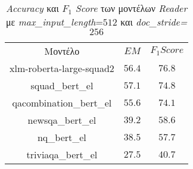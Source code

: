 \begin{table}[H]
    \captionsetup{justification=centering}
    \begin{center}
        \caption{\emph{Accuracy} και \emph{$F_1$ Score} των μοντέλων \emph{Reader} με \emph{max\_input\_length}=$512$ και \emph{doc\_stride=$256$}}
        \begin{tabular}{ | c | c | c | }
            \hline
            \rowcolor{Gray}
            Μοντέλο & \textbf{\emph{$EM$}} & \textbf{\emph{$F_1 Score$}}\\
            xlm-roberta-large-squad2 & $56.4$ & $76.8$\\
            squad\_bert\_el & $57.1$ & $74.8$\\
            qacombination\_bert\_el & $55.6$ & $74.1$\\
            newsqa\_bert\_el & $39.2$ & $58.6$\\
            nq\_bert\_el & $38.5$ & $57.7$\\
            triviaqa\_bert\_el & $27.5$ & $40.7$\\
            \hline
        \end{tabular}
        \label{tab:reader_scores2}
    \end{center}
\end{table}